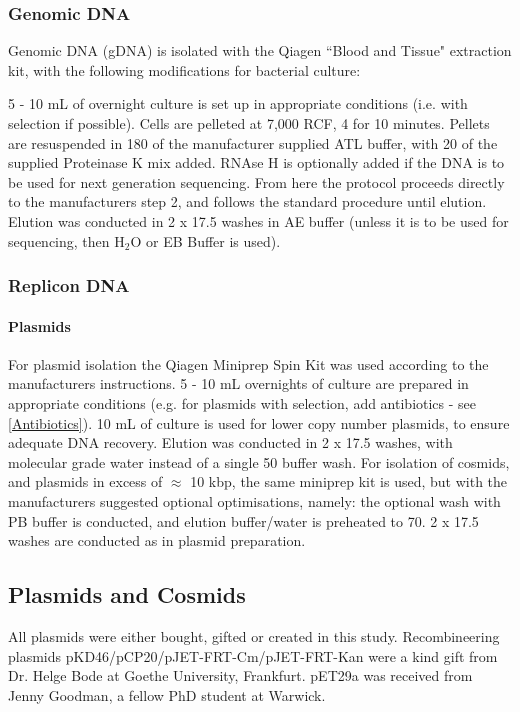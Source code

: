 	\subsubsection{Genomic DNA}\label{gdna}
		Genomic DNA (gDNA) is isolated with the Qiagen ``Blood and Tissue" extraction kit, with the following modifications for bacterial culture:

		 5 - 10 mL of overnight culture is set up in appropriate conditions (i.e. with selection if possible). Cells are pelleted at 7,000 RCF, 4\degC{} for 10 minutes. Pellets are resuspended in 180\ul{} of the manufacturer supplied ATL buffer, with 20\ul{} of the supplied Proteinase K mix added. RNAse H is optionally added if the DNA is to be used for next generation sequencing. From here the protocol proceeds directly to the manufacturers step 2, and follows the standard procedure until elution. Elution was conducted in 2 x 17.5\ul{} washes in AE buffer (unless it is to be used for sequencing, then H$_2$O or EB Buffer is used).

	\subsubsection{Replicon DNA}
			\paragraph{Plasmids}\label{Plasmids}
		For plasmid isolation the Qiagen Miniprep Spin Kit was used according to the manufacturers instructions. 5 - 10 mL overnights of culture are prepared in appropriate conditions (e.g. for plasmids with selection, add antibiotics - see \vref{Antibiotics}). 10 mL of culture is used for lower copy number plasmids, to ensure adequate DNA recovery. Elution was conducted in 2 x 17.5 \ul{} washes, with molecular grade water instead of a single 50 \ul{} buffer wash. For isolation of cosmids, and plasmids in excess of $\approx$ 10 kbp, the same miniprep kit is used, but with the manufacturers suggested optional optimisations, namely: the optional wash with PB buffer is conducted, and elution buffer/water is preheated to 70\degC. 2 x 17.5 \ul{} washes are conducted as in plasmid preparation.

\newpage
	\subsection{Plasmids and Cosmids}
	All plasmids were either bought, gifted or created in this study. Recombineering plasmids pKD46/pCP20/pJET-FRT-Cm/pJET-FRT-Kan were a kind gift from Dr. Helge Bode at Goethe University, Frankfurt. pET29a was received from Jenny Goodman, a fellow PhD student at Warwick.
	
